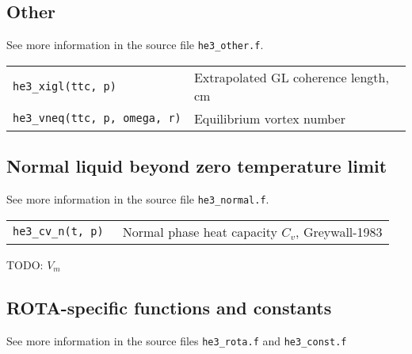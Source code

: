 \documentclass[a4paper]{article}
\begin{document}
\eject

\subsection*{Other}
See more information in the source file {\tt he3\_other.f}.

\medskip
\noindent\begin{tabular}{lp{11cm}}
\tt he3\_xigl(ttc, p) & Extrapolated GL coherence length, cm\\
\tt he3\_vneq(ttc, p, omega, r) & Equilibrium vortex number\\

\end{tabular}
\medskip

\subsection*{Normal liquid beyond zero temperature limit}
See more information in the source file {\tt he3\_normal.f}.

\medskip
\noindent\begin{tabular}{lp{11cm}}
\tt he3\_cv\_n(t, p)  &Normal phase heat capacity $C_v$, {\small Greywall-1983}\\

\end{tabular}
\medskip

TODO: $V_m$

\subsection*{ROTA-specific functions and constants}
See more information in the source files {\tt he3\_rota.f} and {\tt he3\_const.f}
\end{document}
